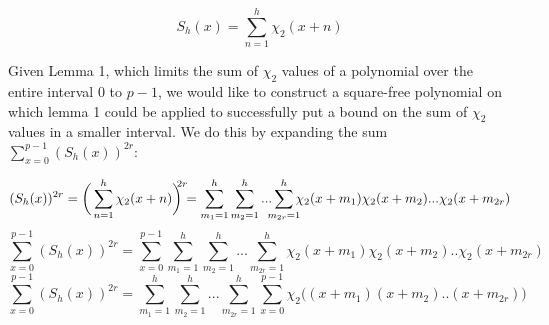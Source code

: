 \documentclass{report}
\begin{document}
$$S_h(x)=\sum\limits_{n=1}^{h}\chi_2(x+n)$$

Given Lemma 1, which limits the sum of $\chi_2$ values of a polynomial over the entire interval $0$ to $p-1$, we would like to construct a square-free polynomial on which lemma 1 could be applied to successfully put a bound on the sum of $\chi_2$ values in a smaller interval. We do this by expanding the sum $\sum\limits_{x=0}^{p-1}(S_h(x))^{2r}$:

$$(S_h(x))^{2r}= \bigg(\sum\limits_{n=1}^{h}\chi_2(x+n)\bigg)^{\mathclap{2r}} =\sum\limits_{m_1=1}^h\sum\limits_{m_2=1}^h...\sum\limits_{\mathclap{m_{2r}=1}}^h\chi_2(x+m_1)\chi_2(x+m_2)...\chi_2(x+m_{2r})$$
$$\sum\limits_{x=0}^{p-1}(S_h(x))^{2r}=\sum\limits_{x=0}^{p-1}\sum\limits_{m_1=1}^h\sum\limits_{m_2=1}^h...\sum\limits_{m_{2r}=1}^h\chi_2(x+m_1)\chi_2(x+m_2)..\chi_2(x+m_{2r})$$
\begin{equation} \label{sumpoly}
\sum\limits_{x=0}^{p-1}(S_h(x))^{2r}=\sum\limits_{m_1=1}^h\sum\limits_{m_2=1}^h...\sum\limits_{m_{2r}=1}^h\sum\limits_{x=0}^{p-1}\chi_2\big((x+m_1)(x+m_2)..(x+m_{2r})\big)
\end{equation}
\end{document}
